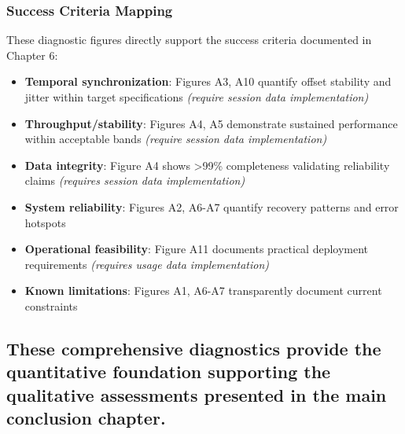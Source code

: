 \documentclass[12pt,a4paper]{article}
\begin{document}
\subsubsection{Success Criteria Mapping}\label{success-criteria-mapping}

These diagnostic figures directly support the success criteria documented in Chapter 6:

\begin{itemize}
\tightlist
\item
  \textbf{Temporal synchronization}: Figures A3, A10 quantify offset stability and jitter within target specifications \emph{(require session data implementation)}
\item
  \textbf{Throughput/stability}: Figures A4, A5 demonstrate sustained performance within acceptable bands \emph{(require session data implementation)}\\
\item
  \textbf{Data integrity}: Figure A4 shows \textgreater99\% completeness validating reliability claims \emph{(requires session data implementation)}
\item
  \textbf{System reliability}: Figures A2, A6-A7 quantify recovery patterns and error hotspots
\item
  \textbf{Operational feasibility}: Figure A11 documents practical deployment requirements \emph{(requires usage data implementation)}
\item
  \textbf{Known limitations}: Figures A1, A6-A7 transparently document current constraints
\end{itemize}

\subsection{These comprehensive diagnostics provide the quantitative foundation supporting the qualitative assessments presented in the main conclusion chapter.}\label{these-comprehensive-diagnostics-provide-the-quantitative-foundation-supporting-the-qualitative-assessments-presented-in-the-main-conclusion-chapter.}
\end{document}
